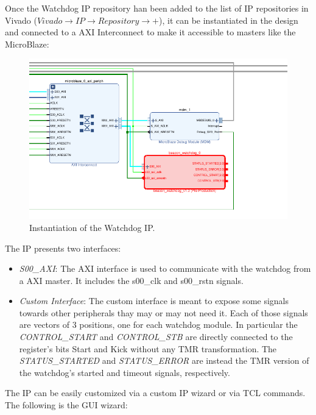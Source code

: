 Once the Watchdog IP repository han been added to the list of IP repositories in Vivado ($Vivado \rightarrow IP \rightarrow Repository \rightarrow +$), it can be instantiated in the design and connected to a AXI Interconnect to make it accessible to masters like the MicroBlaze:

\begin{figure}[H]
\centering
\includegraphics[width=0.9\linewidth]{images/chapter4/wd_ip_inst_cropped2.pdf}
\caption{Instantiation of the Watchdog IP.}
\label{fig:wd_ip_inst}
\end{figure}

The IP presents two interfaces:
\begin{itemize}
    \item \textit{S00\_AXI}: The AXI interface is used to communicate with the watchdog from a AXI master. It includes the s00\_clk and s00\_rstn signals.
    \item \textit{Custom Interface}: The custom interface is meant to expose some signals towards other peripherals thay may or may not need it. Each of those signals are vectors of 3 positions, one for each watchdog module. In particular the \textit{CONTROL\_START} and \textit{CONTROL\_STB} are directly connected to the register's bits Start and Kick without any TMR transformation. The \textit{STATUS\_STARTED} and \textit{STATUS\_ERROR} are instead the TMR version of the watchdog's started and timeout signals, respectively.
\end{itemize}

The IP can be easily customized via a custom IP wizard or via TCL commands. The following is the GUI wizard:

